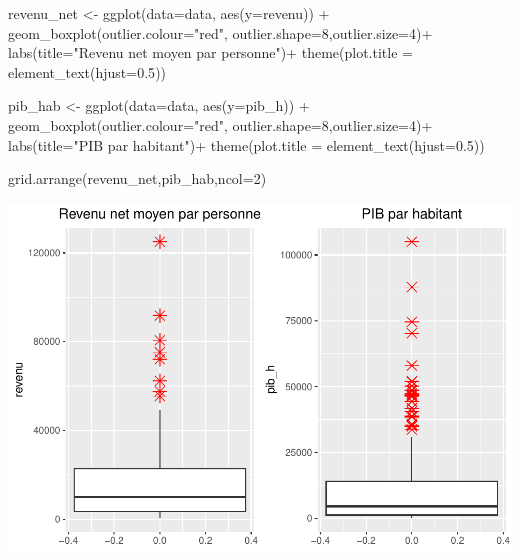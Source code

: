 \documentclass[
]{article}
\newenvironment{Shaded}{\begin{snugshade}}{\end{snugshade}}
\newcommand{\AttributeTok}[1]{\textcolor[rgb]{0.77,0.63,0.00}{#1}}
\newcommand{\DecValTok}[1]{\textcolor[rgb]{0.00,0.00,0.81}{#1}}
\newcommand{\FloatTok}[1]{\textcolor[rgb]{0.00,0.00,0.81}{#1}}
\newcommand{\FunctionTok}[1]{\textcolor[rgb]{0.00,0.00,0.00}{#1}}
\newcommand{\NormalTok}[1]{#1}
\newcommand{\OtherTok}[1]{\textcolor[rgb]{0.56,0.35,0.01}{#1}}
\newcommand{\SpecialCharTok}[1]{\textcolor[rgb]{0.00,0.00,0.00}{#1}}
\newcommand{\StringTok}[1]{\textcolor[rgb]{0.31,0.60,0.02}{#1}}
\begin{document}
\begin{Shaded}
\begin{Highlighting}[]
\NormalTok{revenu\_net }\OtherTok{\textless{}{-}} \FunctionTok{ggplot}\NormalTok{(}\AttributeTok{data=}\NormalTok{data, }\FunctionTok{aes}\NormalTok{(}\AttributeTok{y=}\NormalTok{revenu)) }\SpecialCharTok{+} 
  \FunctionTok{geom\_boxplot}\NormalTok{(}\AttributeTok{outlier.colour=}\StringTok{"red"}\NormalTok{, }\AttributeTok{outlier.shape=}\DecValTok{8}\NormalTok{,}\AttributeTok{outlier.size=}\DecValTok{4}\NormalTok{)}\SpecialCharTok{+}
  \FunctionTok{labs}\NormalTok{(}\AttributeTok{title=}\StringTok{"Revenu net moyen par personne"}\NormalTok{)}\SpecialCharTok{+}
  \FunctionTok{theme}\NormalTok{(}\AttributeTok{plot.title =} \FunctionTok{element\_text}\NormalTok{(}\AttributeTok{hjust=}\FloatTok{0.5}\NormalTok{))}

\NormalTok{pib\_hab }\OtherTok{\textless{}{-}} \FunctionTok{ggplot}\NormalTok{(}\AttributeTok{data=}\NormalTok{data, }\FunctionTok{aes}\NormalTok{(}\AttributeTok{y=}\NormalTok{pib\_h)) }\SpecialCharTok{+} 
  \FunctionTok{geom\_boxplot}\NormalTok{(}\AttributeTok{outlier.colour=}\StringTok{"red"}\NormalTok{, }\AttributeTok{outlier.shape=}\DecValTok{8}\NormalTok{,}\AttributeTok{outlier.size=}\DecValTok{4}\NormalTok{)}\SpecialCharTok{+}
  \FunctionTok{labs}\NormalTok{(}\AttributeTok{title=}\StringTok{"PIB par habitant"}\NormalTok{)}\SpecialCharTok{+}
  \FunctionTok{theme}\NormalTok{(}\AttributeTok{plot.title =} \FunctionTok{element\_text}\NormalTok{(}\AttributeTok{hjust=}\FloatTok{0.5}\NormalTok{))}

\FunctionTok{grid.arrange}\NormalTok{(revenu\_net,pib\_hab,}\AttributeTok{ncol=}\DecValTok{2}\NormalTok{)}
\end{Highlighting}
\end{Shaded}

\includegraphics{projet_apprentissage_non_supp_files/figure-latex/unnamed-chunk-7-1.pdf}
\end{document}
